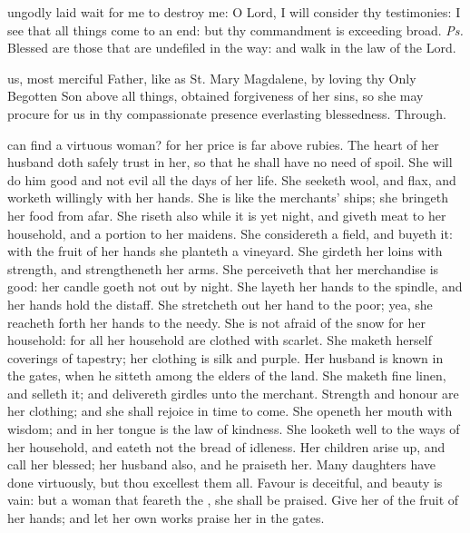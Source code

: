 
\introit
{} ungodly laid wait for me to destroy me: O Lord, I will consider thy testimonies: I see that all things come to an end: but thy commandment is exceeding broad. \textit{Ps.} Blessed are those that are undefiled in the way: and walk in the law of the Lord.

\collect
{} us, most merciful Father, like as St. Mary Magdalene, by loving thy Only Begotten Son above all things, obtained forgiveness of her sins, so she may procure for us in thy compassionate presence everlasting blessedness. Through.

 can find a virtuous woman? for her price is far above rubies. The heart of her husband doth safely trust in her, so that he shall have no need of spoil. She will do him good and not evil all the days of her life. She seeketh wool, and flax, and worketh willingly with her hands. She is like the merchants' ships; she bringeth her food from afar. She riseth also while it is yet night, and giveth meat to her household, and a portion to her maidens. She considereth a field, and buyeth it: with the fruit of her hands she planteth a vineyard. She girdeth her loins with strength, and strengtheneth her arms. She perceiveth that her merchandise is good: her candle goeth not out by night. She layeth her hands to the spindle, and her hands hold the distaff. She stretcheth out her hand to the poor; yea, she reacheth forth her hands to the needy. She is not afraid of the snow for her household: for all her household are clothed with scarlet. She maketh herself coverings of tapestry; her clothing is silk and purple. Her husband is known in the gates, when he sitteth among the elders of the land. She maketh fine linen, and selleth it; and delivereth girdles unto the merchant. Strength and honour are her clothing; and she shall rejoice in time to come. She openeth her mouth with wisdom; and in her tongue is the law of kindness. She looketh well to the ways of her household, and eateth not the bread of idleness. Her children arise up, and call her blessed; her husband also, and he praiseth her. Many daughters have done virtuously, but thou excellest them all. Favour is deceitful, and beauty is vain: but a woman that feareth the , she shall be praised. Give her of the fruit of her hands; and let her own works praise her in the gates.


